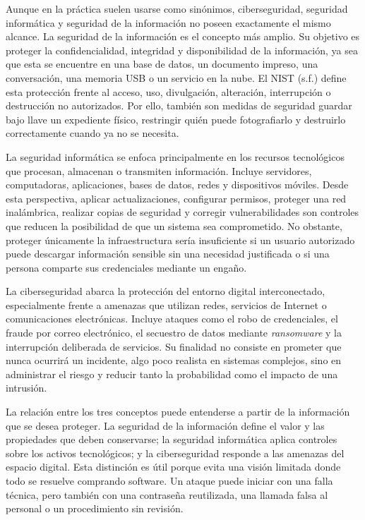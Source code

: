 \documentclass[12pt,letterpaper]{article}
\begin{document}
Aunque en la práctica suelen usarse como sinónimos, ciberseguridad, seguridad informática y seguridad de la información no poseen exactamente el mismo alcance. La seguridad de la información es el concepto más amplio. Su objetivo es proteger la confidencialidad, integridad y disponibilidad de la información, ya sea que esta se encuentre en una base de datos, un documento impreso, una conversación, una memoria USB o un servicio en la nube. El NIST (s.f.) define esta protección frente al acceso, uso, divulgación, alteración, interrupción o destrucción no autorizados. Por ello, también son medidas de seguridad guardar bajo llave un expediente físico, restringir quién puede fotografiarlo y destruirlo correctamente cuando ya no se necesita.

La seguridad informática se enfoca principalmente en los recursos tecnológicos que procesan, almacenan o transmiten información. Incluye servidores, computadoras, aplicaciones, bases de datos, redes y dispositivos móviles. Desde esta perspectiva, aplicar actualizaciones, configurar permisos, proteger una red inalámbrica, realizar copias de seguridad y corregir vulnerabilidades son controles que reducen la posibilidad de que un sistema sea comprometido. No obstante, proteger únicamente la infraestructura sería insuficiente si un usuario autorizado puede descargar información sensible sin una necesidad justificada o si una persona comparte sus credenciales mediante un engaño.

La ciberseguridad abarca la protección del entorno digital interconectado, especialmente frente a amenazas que utilizan redes, servicios de Internet o comunicaciones electrónicas. Incluye ataques como el robo de credenciales, el fraude por correo electrónico, el secuestro de datos mediante \textit{ransomware} y la interrupción deliberada de servicios. Su finalidad no consiste en prometer que nunca ocurrirá un incidente, algo poco realista en sistemas complejos, sino en administrar el riesgo y reducir tanto la probabilidad como el impacto de una intrusión.

La relación entre los tres conceptos puede entenderse a partir de la información que se desea proteger. La seguridad de la información define el valor y las propiedades que deben conservarse; la seguridad informática aplica controles sobre los activos tecnológicos; y la ciberseguridad responde a las amenazas del espacio digital. Esta distinción es útil porque evita una visión limitada donde todo se resuelve comprando software. Un ataque puede iniciar con una falla técnica, pero también con una contraseña reutilizada, una llamada falsa al personal o un procedimiento sin revisión.
\end{document}
